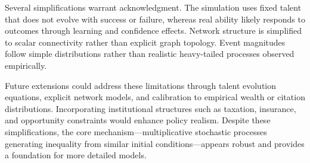 Several simplifications warrant acknowledgment. The simulation uses fixed
talent that does not evolve with success or failure, whereas real
ability likely responds to outcomes through learning and confidence
effects. Network structure is simplified to scalar connectivity rather than
explicit graph topology. Event magnitudes follow simple distributions
rather than realistic heavy-tailed processes observed empirically.

Future extensions could address these limitations through talent
evolution equations, explicit network models, and calibration to
empirical wealth or citation distributions. Incorporating institutional structures
such as taxation, insurance, and opportunity constraints would enhance policy
realism. Despite these simplifications, the core mechanism—multiplicative
stochastic processes generating inequality from similar initial conditions—appears
robust and provides a foundation for more detailed models.